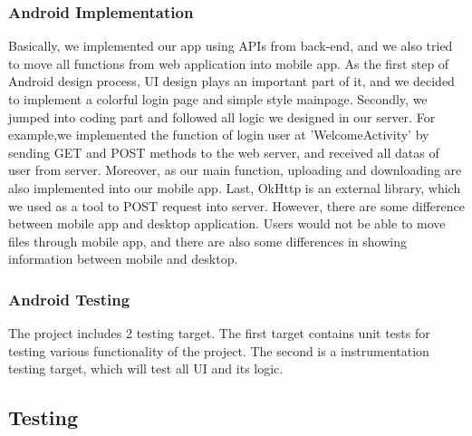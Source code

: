 \documentclass[12pt,a4]{article}
\begin{document}
\subsubsection{Android Implementation}\label{4.3.2}
Basically, we implemented our app using APIs from back-end, and we also tried to move all functions from web application into mobile app. As the first step of Android design process, UI design plays an important part of it, and we decided to implement a colorful login page and simple style mainpage. Secondly, we jumped into coding part and followed all logic we designed in our server. For example,we implemented the function of login user at 'WelcomeActivity' by sending GET and POST methods to the web server, and received all datas of user from server. Moreover, as our main function, uploading and downloading are also implemented into our mobile app. Last, OkHttp is an external library, which we  used as a tool to POST request into server. However, there are some difference between mobile app and desktop application. Users would not be able to move files through mobile app, and there are also some differences in showing information between mobile and desktop.


\subsubsection{Android Testing}\label{4.3.3}
The project includes 2 testing target. The first target contains unit tests for testing various functionality of the project. The second is a instrumentation testing target, which will test all UI and its logic.

\subsection{Testing}\label{4.4}
\end{document}
